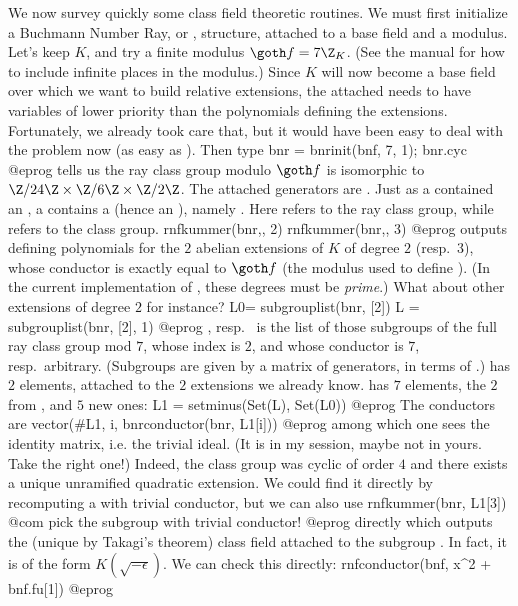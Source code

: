 We now survey quickly some class field theoretic routines. We must first
initialize a Buchmann Number Ray, or , structure, attached to a
 base field and a modulus. Let's keep $K$, and try a finite modulus
${\goth f} = 7\Z_K$. (See the manual for how to include infinite places in
the modulus.) Since $K$ will now become a base field over which we want to
build relative extensions, the attached  needs to have variables
of lower priority than the polynomials defining the extensions. Fortunately,
we already took care that, but it would have been easy to deal with the
problem now (as easy as ). Then type
\bprog
  bnr = bnrinit(bnf, 7, 1);
  bnr.cyc
@eprog\noindent
tells us the ray class group modulo ${\goth f}$ is isomorphic to
$\Z/24\Z \times \Z/6\Z \times \Z/2\Z $. The attached generators are
.  Just as a  contained an , a 
contains a  (hence an ), namely . Here
 refers to the ray class group, while  refers
to the class group.
\bprog
  rnfkummer(bnr,, 2)
  rnfkummer(bnr,, 3)
@eprog\noindent
outputs defining polynomials for the $2$ abelian extensions of $K$ of degree
$2$ (resp.~$3$), whose conductor is exactly equal to ${\goth f}$ (the modulus
used to define ). (In the current implementation of ,
these degrees must be \emph{prime}.) What about other extensions of degree
$2$ for instance?
\bprog
  L0= subgrouplist(bnr, [2])
  L = subgrouplist(bnr, [2], 1)
@eprog\noindent
{}, resp.~ is the list of those subgroups of the full ray class
group mod $7$, whose index is $2$, and whose conductor is $7$,
resp.~arbitrary. (Subgroups are given by a matrix of generators, in terms of
.)  has $2$ elements, attached to the $2$ extensions
we already know.  has $7$ elements, the $2$ from , and
$5$ new ones:
\bprog
  L1 = setminus(Set(L), Set(L0))
@eprog\noindent
The conductors are
\bprog
  vector(#L1, i, bnrconductor(bnr, L1[i]))
@eprog\noindent
among which one sees the identity matrix, i.e. the trivial ideal. (It is
 in my session, maybe not in yours. Take the right one!) Indeed,
the class group was cyclic of order $4$ and there exists a unique unramified
quadratic extension. We could find it directly by recomputing a 
with trivial conductor, but we can also use
\bprog
  rnfkummer(bnr, L1[3]) \\ @com pick the subgroup with trivial conductor!
@eprog\noindent
directly which outputs the (unique by Takagi's theorem) class field
attached to the subgroup . In fact, it is of the form
$K(\sqrt{-\epsilon})$. We can check this directly:
\bprog
  rnfconductor(bnf, x^2 + bnf.fu[1])
@eprog\noindent

